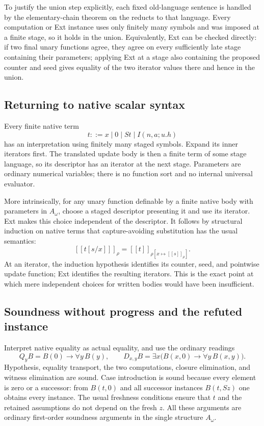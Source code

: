 \documentclass[11pt,letterpaper]{article}
\theoremstyle{definition}
\newcommand{\llbracket}{[\![}
\newcommand{\rrbracket}{]\!]}
\begin{document}
To justify the union step explicitly, each fixed old-language sentence is
handled by the elementary-chain theorem on the reducts to that language.
Every computation or Ext instance uses only finitely many symbols and was
imposed at a finite stage, so it holds in the union. Equivalently, Ext can
be checked directly: if two final unary functions agree, they agree on
every sufficiently late stage containing their parameters; applying Ext at
a stage also containing the proposed counter and seed gives equality of
the two iterator values there and hence in the union.

\subsection{Returning to native scalar syntax}

Every finite native term
\[
 t::=x\mid0\mid St\mid I(n,a;u.h)
\]
has an interpretation using finitely many staged symbols. Expand its inner
iterators first. The translated update body is then a finite term of some
stage language, so its descriptor has an iterator at the next stage.
Parameters are ordinary numerical variables; there is no function sort and
no internal universal evaluator.

More intrinsically, for any unary function definable by a finite native
body with parameters in $A_\omega$, choose a staged descriptor presenting
it and use its iterator. Ext makes this choice independent of the
descriptor. It follows by structural induction on native terms that
capture-avoiding substitution has the usual semantics:
\[
 \llbracket t[s/x]\rrbracket_\rho
 =\llbracket t\rrbracket_{\rho[x\mapsto\llbracket s\rrbracket_\rho]}.
\]
At an iterator, the induction hypothesis identifies its counter, seed, and
pointwise update function; Ext identifies the resulting iterators. This is
the exact point at which mere independent choices for written bodies would
have been insufficient.

\subsection{Soundness without progress and the refuted instance}

Interpret native equality as actual equality, and use the ordinary readings
\[
 Q_y B=B(0)\to\forall y\,B(y),\qquad
 D_{x,y}B=\exists x\bigl(B(x,0)\to\forall y\,B(x,y)\bigr).
\]
Hypothesis, equality transport, the two computations, closure elimination,
and witness elimination are sound. Case introduction is sound because every
element is zero or a successor: from $B(t,0)$ and all successor instances
$B(t,Sz)$ one obtains every instance. The usual freshness conditions ensure
that $t$ and the retained assumptions do not depend on the fresh $z$.
All these arguments are ordinary first-order soundness arguments in the
single structure $A_\omega$.
\end{document}
